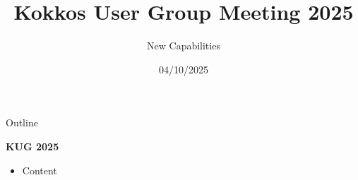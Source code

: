 
\usepackage{tikz}
\graphicspath{{4_6/figures/}}
\usepackage{multicol}
\usepackage{pgfplots}

\def\ornlid{THIS WILL NEED TO BE UPDATED AFTER RESOLUTION}

\title{Kokkos User Group Meeting 2025}

\author{New Capabilities}

\date{04/10/2025}





\begin{frame}
  \titlepage
\end{frame}


\begin{frame}[fragile]{Outline}

  \textbf{KUG 2025}

  \begin{itemize}
    \item{Content}
  \end{itemize}

\end{frame}





